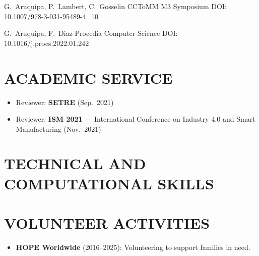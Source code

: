\documentclass[11pt,oneside,a4paper]{article} %
\begin{document}
{\begin{minipage}{11.3cm}
\vspace*{0.12cm}

{G.~Aruquipa, P.~Lambert, C.~Gosselin}
{CCToMM M3 Symposium}
{DOI: 10.1007/978-3-031-95489-4\_10}

\vspace*{0.10cm}

{G.~Aruquipa, F.~Diaz}
{Procedia Computer Science}
{DOI: 10.1016/j.procs.2022.01.242}
\section*{{\faBook} ACADEMIC SERVICE}
\footnotesize
\begin{itemize}[leftmargin=*, itemsep=0.2ex]
\item Reviewer: \textbf{SETRE} (Sep.\ 2021)
\item Reviewer: \textbf{ISM 2021} --- International Conference on Industry 4.0 and Smart Manufacturing (Nov.\ 2021)
\end{itemize}
\normalsize

\section*{{\faDesktop} TECHNICAL AND COMPUTATIONAL SKILLS}


\vspace*{0.12cm}


\vspace*{0.12cm}


\vspace*{0.12cm}


\section*{{\aiImpactstory} VOLUNTEER ACTIVITIES}
\begin{itemize}[leftmargin=*, itemsep=0.2ex]
\footnotesize
\item \textbf{HOPE Worldwide} (2016--2025): Volunteering to support families in need.
\end{itemize}

\end{minipage}}
\end{document}

